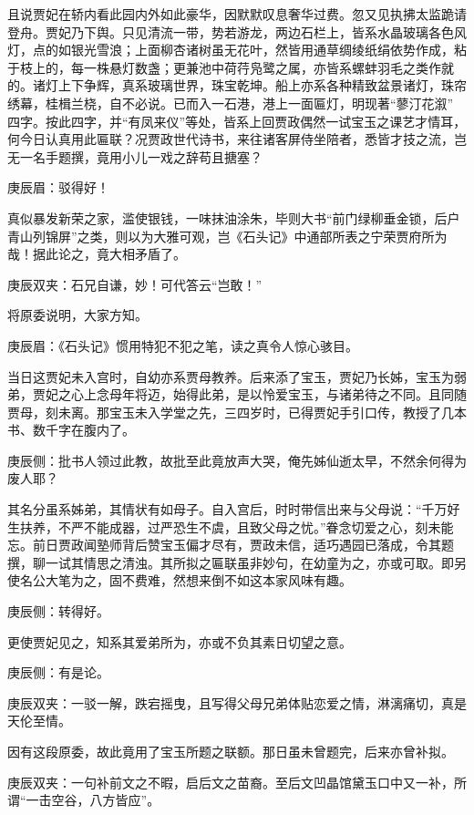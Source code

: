 \begin{parag}
    且说贾妃在轿内看此园内外如此豪华，因默默叹息奢华过费。忽又见执拂太监跪请登舟。贾妃乃下舆。只见清流一带，势若游龙，两边石栏上，皆系水晶玻璃各色风灯，点的如银光雪浪；上面柳杏诸树虽无花叶，然皆用通草绸绫纸绢依势作成，粘于枝上的，每一株悬灯数盏；更兼池中荷荇凫鹭之属，亦皆系螺蚌羽毛之类作就的。诸灯上下争辉，真系玻璃世界，珠宝乾坤。船上亦系各种精致盆景诸灯，珠帘绣幕，桂楫兰桡，自不必说。已而入一石港，港上一面匾灯，明现著“蓼汀花溆” 四字。按此四字，并“有凤来仪”等处，皆系上回贾政偶然一试宝玉之课艺才情耳，何今日认真用此匾联？况贾政世代诗书，来往诸客屏侍坐陪者，悉皆才技之流，岂无一名手题撰，竟用小儿一戏之辞苟且搪塞？\begin{note}庚辰眉：驳得好！\end{note}真似暴发新荣之家，滥使银钱，一味抹油涂朱，毕则大书“前门绿柳垂金锁，后户青山列锦屏”之类，则以为大雅可观，岂《石头记》中通部所表之宁荣贾府所为哉！据此论之，竟大相矛盾了。\begin{note}庚辰双夹：石兄自谦，妙！可代答云“岂敢！”\end{note}将原委说明，大家方知。\begin{note}庚辰眉：《石头记》惯用特犯不犯之笔，读之真令人惊心骇目。\end{note}
\end{parag}


\begin{parag}
    当日这贾妃未入宫时，自幼亦系贾母教养。后来添了宝玉，贾妃乃长姊，宝玉为弱弟，贾妃之心上念母年将迈，始得此弟，是以怜爱宝玉，与诸弟待之不同。且同随贾母，刻未离。那宝玉未入学堂之先，三四岁时，已得贾妃手引口传，教授了几本书、数千字在腹内了。\begin{note}庚辰侧：批书人领过此教，故批至此竟放声大哭，俺先姊仙逝太早，不然余何得为废人耶？\end{note}其名分虽系姊弟，其情状有如母子。自入宫后，时时带信出来与父母说：“千万好生扶养，不严不能成器，过严恐生不虞，且致父母之忧。”眷念切爱之心，刻未能忘。前日贾政闻塾师背后赞宝玉偏才尽有，贾政未信，适巧遇园已落成，令其题撰，聊一试其情思之清浊。其所拟之匾联虽非妙句，在幼童为之，亦或可取。即另使名公大笔为之，固不费难，然想来倒不如这本家风味有趣。\begin{note}庚辰侧：转得好。\end{note}更使贾妃见之，知系其爱弟所为，亦或不负其素日切望之意。\begin{note}庚辰侧：有是论。\end{note}\begin{note}庚辰双夹：一驳一解，跌宕摇曳，且写得父母兄弟体贴恋爱之情，淋漓痛切，真是天伦至情。\end{note}因有这段原委，故此竟用了宝玉所题之联额。那日虽未曾题完，后来亦曾补拟。\begin{note}庚辰双夹：一句补前文之不暇，启后文之苗裔。至后文凹晶馆黛玉口中又一补，所谓“一击空谷，八方皆应”。\end{note}
\end{parag}


